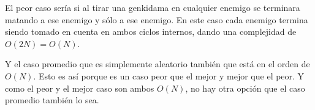 
El peor caso sería si al tirar una genkidama en cualquier enemigo se terminara matando a ese enemigo y sólo a ese enemigo. En este caso cada enemigo termina siendo tomado en cuenta en ambos ciclos internos, dando una complejidad de $O(2N) = O(N)$.


Y el caso promedio que es simplemente aleatorio también que está en el orden de $O(N)$. Esto es así porque es un caso peor que el mejor y mejor que el peor. Y como el peor y el mejor caso son ambos $O(N)$, no hay otra opción que el caso promedio también lo sea.